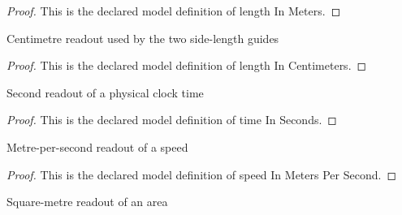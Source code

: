 \begin{proof}
  This is the declared model definition of length In Meters.
\end{proof}
\begin{definition}
  \label{def:physics:phyx-mini-0931:phyxminiproblems-problemphyxmini0931-lengthincentimeters}
  Centimetre readout used by the two side-length guides
\end{definition}
\begin{proof}
  This is the declared model definition of length In Centimeters.
\end{proof}
\begin{definition}
  \label{def:physics:phyx-mini-0931:phyxminiproblems-problemphyxmini0931-timeinseconds}
  Second readout of a physical clock time
\end{definition}
\begin{proof}
  This is the declared model definition of time In Seconds.
\end{proof}
\begin{definition}
  \label{def:physics:phyx-mini-0931:phyxminiproblems-problemphyxmini0931-speedinmeterspersecond}
  Metre-per-second readout of a speed
\end{definition}
\begin{proof}
  This is the declared model definition of speed In Meters Per Second.
\end{proof}
\begin{definition}
  \label{def:physics:phyx-mini-0931:phyxminiproblems-problemphyxmini0931-areainsquaremeters}
  Square-metre readout of an area
\end{definition}
